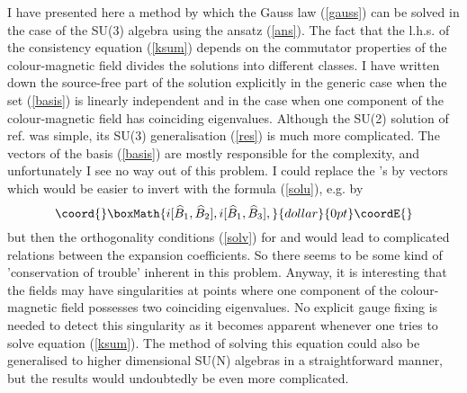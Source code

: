 \documentclass[a4paper,12pt]{article}
\begin{document}
I have presented here a method by which the Gauss law (\ref{gauss}) can be solved in the case of the SU(3) algebra using the ansatz (\ref{ans}). The fact that the l.h.s. of the consistency equation (\ref{ksum}) depends on the commutator properties of the colour-magnetic field divides the solutions into different classes. I have written down the source-free part of the solution explicitly in the generic case when the set (\ref{basis}) is linearly independent and in the case when one component of the colour-magnetic field has coinciding eigenvalues. Although the SU(2) solution of ref. \cite{ms1} was simple, its SU(3) generalisation (\ref{res}) is much more complicated. The vectors \coordHE{} of the basis (\ref{basis}) are mostly responsible for the complexity, and unfortunately I see no way out of this problem. I could replace the \coordHE{}'s by vectors which would be easier to invert with the formula (\ref{solu}),  e.g. by
$$\coord{}\boxMath{ i[\widehat{B}_1,\widehat{B}_2], i[\widehat{B}_1,\widehat{B}_3], }{dollar}{0pt}\coordE{}$$
but then the orthogonality conditions (\ref{solv}) for \coordHE{} and \coordHE{} would lead to complicated relations between the expansion coefficients. So there seems to be some kind of 'conservation of trouble' inherent in this problem. Anyway, it is interesting that the fields \coordHE{} may have singularities at points where one component of the colour-magnetic field possesses two coinciding eigenvalues. No explicit gauge fixing is needed to detect this singularity as it becomes apparent whenever one tries to solve equation (\ref{ksum}). The method of solving this equation could also be generalised to higher dimensional SU(N) algebras in a straightforward manner, but the results would undoubtedly be even more complicated.

\appendix
\end{document}
